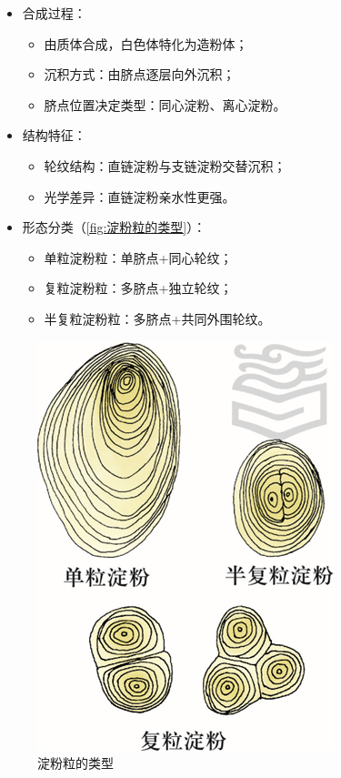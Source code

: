 	 \begin{itemize}
	 	\item 合成过程：
	 	\begin{itemize}
	 		\item 由质体合成，白色体特化为造粉体；
	 		\item 沉积方式：由脐点逐层向外沉积；
 			\item 脐点位置决定类型：同心淀粉、离心淀粉。
	 	\end{itemize}
	 	\item 结构特征：
	 	\begin{itemize}
	 		\item 轮纹结构：直链淀粉与支链淀粉交替沉积；
	 		\item 光学差异：直链淀粉亲水性更强。
	 	\end{itemize}
	 	\item 形态分类（\autoref{fig:淀粉粒的类型}）：
	 	\begin{itemize}
	 		\item 单粒淀粉粒：单脐点+同心轮纹；
	 		\item 复粒淀粉粒：多脐点+独立轮纹；
	 		\item 半复粒淀粉粒：多脐点+共同外围轮纹。
	 	\end{itemize}
	 \end{itemize}
	 
	 \begin{figure}
	 	\centering
	 	\includegraphics[width=0.3\linewidth]{Pics/淀粉粒的类型}
	 	\caption{淀粉粒的类型}
	 	\label{fig:淀粉粒的类型}
	 \end{figure}
	 
